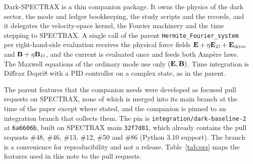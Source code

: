 Dark-SPECTRAX is a thin companion package. It owns the physics of the dark sector, the mode and ledger bookkeeping, the study scripts and the records, and it delegates the velocity-space kernel, the Fourier machinery and the time stepping to SPECTRAX. A single call of the parent \texttt{Hermite\_Fourier\_system} per right-hand-side evaluation receives the physical force fields $\mathbf{E}+\eta\mathbf{E}_D+\mathbf{E}_{\rm drive}$ and $\mathbf{B}+\eta\mathbf{B}_D$, and the current is evaluated once and feeds both Ampère laws. The Maxwell equations of the ordinary mode use only $(\mathbf{E},\mathbf{B})$. Time integration is Diffrax Dopri8 with a PID controller on a complex state, as in the parent.

The parent features that the companion needs were developed as focused pull requests on SPECTRAX, none of which is merged into its main branch at the time of the paper except where stated, and the companion is pinned to an integration branch that collects them. The pin is \texttt{integration/dark-baseline-2} at \texttt{6a6606b}, built on SPECTRAX main \texttt{32f7d81}, which already contains the pull requests \#48, \#46, \#13, \#12, \#50 and \#86 (Python 3.10 support). The branch is a convenience for reproducibility and not a release. Table~\ref{tab:prs} maps the features used in this note to the pull requests.

